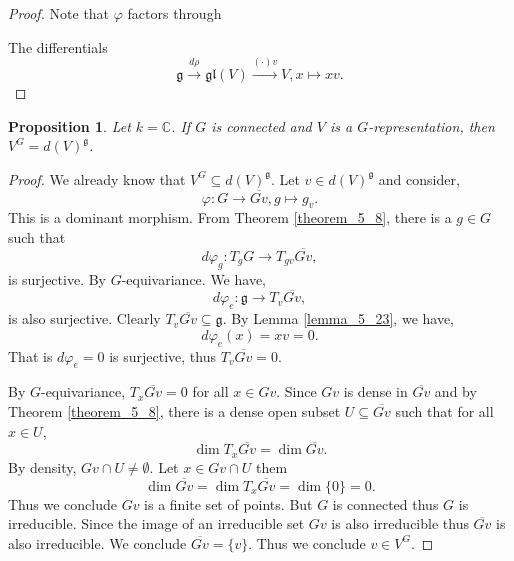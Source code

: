 \documentclass[10pt]{article}
\newtheorem{proposition}{Proposition}[section]
\numberwithin{equation}{theorem}
\DeclareMathOperator{\End}{End}
\DeclareMathOperator{\GL}{GL}
\newcommand{\C}[0]{\mathbb{C}}
\newcommand{\g}[0]{\mathfrak{g}}
\newcommand{\gl}[0]{\mathfrak{gl}}
\begin{document}
\begin{proof}
  Note that $\varphi$ factors through 
  \begin{center}
  \end{center}
  The differentials 
  \begin{equation*}
    \g\stackrel{d\rho}{\to}\gl(V)\stackrel{(\cdot)v}{\to}V, x\mapsto xv.
  \end{equation*}
\end{proof}

\begin{proposition}
  \label{proposition_5_24}
  Let $k=\C$. If $G$ is connected and $V$ is a $G$-representation, then $V^G = d(V)^\g$.
\end{proposition}
\begin{proof}
  We already know that $V^G\subseteq d(V)^\g$. Let $v\in d(V)^\g$ and consider,
  \begin{equation*}
    \varphi:G\to \overline{Gv}, g\mapsto g_v.
  \end{equation*}
  This is a dominant morphism. From Theorem \ref{theorem_5_8}, there is a $g\in G$ such that 
  \begin{equation*}
    d\varphi_g:T_gG\to T_{gv}\overline{Gv},
  \end{equation*}
  is surjective. By $G$-equivariance. We have,
  \begin{equation*}
    d\varphi_e:\g\to T_v\overline{Gv},
  \end{equation*}
  is also surjective. Clearly $T_v\overline{Gv}\subseteq\g$. By Lemma \ref{lemma_5_23}, we have,
  \begin{equation*}
    d\varphi_e(x) = xv = 0.
  \end{equation*}
  That is $d\varphi_e=0$ is surjective, thus $T_v\overline{Gv}= 0$.\\
  \par By $G$-equivariance, $T_x\overline{Gv}=0$ for all $x\in Gv$. Since $Gv$ is dense in $\overline{Gv}$ and by Theorem \ref{theorem_5_8}, there is a dense open subset $U\subseteq \overline{Gv}$ such that for all $x\in U$,
  \begin{equation*}
    \dim T_x\overline{Gv} = \dim\overline{Gv}.
  \end{equation*}
  By density, $Gv\cap U\not=\emptyset$. Let $x\in Gv\cap U$ them
  \begin{equation*}
    \dim\overline{Gv} = \dim T_x\overline{Gv} = \dim\{0\}=0.
  \end{equation*}
  Thus we conclude ${Gv}$ is a finite set of points. But $G$ is connected thus $G$ is irreducible. %
  Since the image of an irreducible set  $Gv$ is also irreducible thus $\overline{Gv}$ is also irreducible. We conclude $\overline{Gv} = \{v\}$. Thus we conclude $v\in V^G$.
\end{proof}
\end{document}
